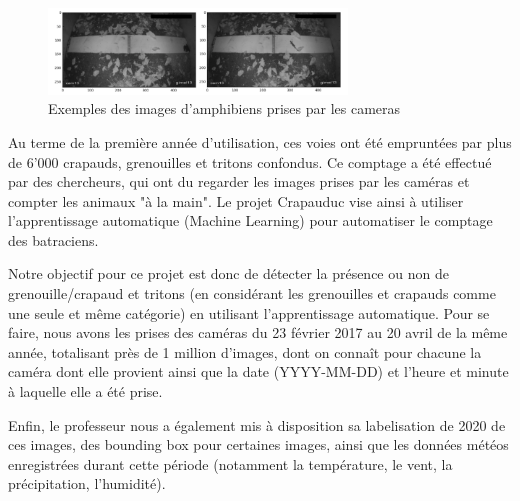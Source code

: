 \newpage

\begin{figure}[!htb]
    \centering
    \includegraphics[width=300px]{images/introduction_crapauduc_exemple_prise_camera.png}
    \caption{Exemples des images d'amphibiens prises par les cameras}
    \label{fig:Exemples des images d'amphibiens prises par les cameras}
\end{figure}

 Au terme de la première année d'utilisation, ces voies ont été empruntées par plus de 6'000 crapauds, grenouilles et tritons confondus. Ce comptage a été effectué par des chercheurs, qui ont du regarder les images prises par les caméras et compter les animaux "à la main". Le projet Crapauduc vise ainsi à utiliser l'apprentissage automatique (Machine Learning) pour automatiser le comptage des batraciens. \newline

Notre objectif pour ce projet est donc de détecter la présence ou non de grenouille/crapaud et tritons (en considérant les grenouilles et crapauds comme une seule et même catégorie) en utilisant l'apprentissage automatique. Pour se faire, nous avons les prises des caméras du 23 février 2017 au 20 avril de la même année, totalisant près de 1 million d'images, dont on connaît pour chacune la caméra dont elle provient ainsi que la date (YYYY-MM-DD) et l'heure et minute à laquelle elle a été prise.\newline

Enfin, le professeur nous a également mis à disposition sa labelisation de 2020 de ces images, des bounding box pour certaines images, ainsi que les données météos enregistrées durant cette période (notamment la température, le vent, la précipitation, l'humidité).

